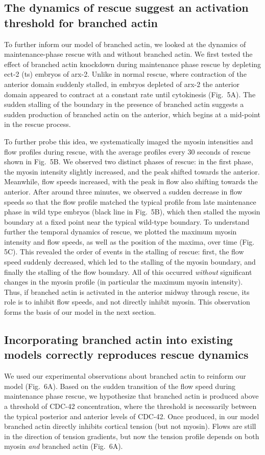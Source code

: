 \documentclass[11pt]{article}
\newcommand{\6}[1]{#1_{\text{6}}}
\newcommand{\3}[1]{#1_{\text{3}}}
\begin{document}
\subsection*{The dynamics of rescue suggest an activation threshold for branched actin}
To further inform our model of branched actin, we looked at the dynamics of maintenance-phase rescue with and without branched actin. We first tested the effect of branched actin knockdown during maintenance phase rescue by depleting ect-2 (ts) embryos of arx-2. Unlike in normal rescue, where contraction of the anterior domain suddenly stalled, in embryos depleted of arx-2 the anterior domain appeared to contract at a constant rate until cytokinesis (Fig.\ 5A). The sudden stalling of the boundary in the presence of branched actin suggests a sudden production of branched actin on the anterior, which begins at a mid-point in the rescue process. 

To further probe this idea, we systematically imaged the myosin intensities and flow profiles during rescue, with the average profiles every 30 seconds of rescue shown in Fig.\ 5B. We observed two distinct phases of rescue: in the first phase, the myosin intensity slightly increased, and the peak shifted towards the anterior. Meanwhile, flow speeds increased, with the peak in flow also shifting towards the anterior. After around three minutes, we observed a sudden decrease in flow speeds so that the flow profile matched the typical profile from late maintenance phase in wild type embryos (black line in Fig.\ 5B), which then stalled the myosin boundary at a fixed point near the typical wild-type boundary. To understand further the temporal dynamics of rescue, we plotted the maximum myosin intensity and flow speeds, as well as the position of the maxima, over time (Fig. 5C). This revealed the order of events in the stalling of rescue: first, the flow speed suddenly decreased, which led to the stalling of the myosin boundary, and finally the stalling of the flow boundary. All of this occurred \emph{without} significant changes in the myosin profile (in particular the maximum myosin intensity). Thus, if branched actin is activated in the anterior midway through rescue, its role is to inhibit flow speeds, and not directly inhibit myosin. This observation forms the basis of our model in the next section.

\subsection*{Incorporating branched actin into existing models correctly reproduces rescue dynamics}
We used our experimental observations about branched actin to reinform our model (Fig.\ 6A). Based on the sudden transition of the flow speed during maintenance phase rescue, we hypothesize that branched actin is produced above a threshold of CDC-42 concentration, where the threshold is necessarily between the typical posterior and anterior levels of CDC-42. Once produced, in our model branched actin directly inhibits cortical tension (but not myosin). Flows are still in the direction of tension gradients, but now the tension profile depends on both myosin \emph{and} branched actin (Fig.\ 6A). 
\end{document}
